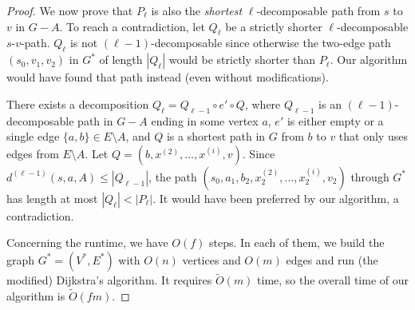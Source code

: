 \documentclass{article}\usepackage[a4paper,margin=20mm]{geometry}
\newcommand*{\Otilde}{\widetilde{O}}
\newcommand*{\length}[1]{|#1|}
\renewcommand{\le}{\leqslant}
\begin{document}
\begin{proof}
We now prove that $P_{\ell}$ is also the \emph{shortest} $\ell$-decomposable path from $s$ to $v$
in $G{-}A$.
To reach a contradiction, let $Q_{\ell}$ be a strictly shorter $\ell$-decomposable $s$-$v$-path.
$Q_{\ell}$ is not $(\ell{-}1)$-decomposable
since otherwise the two-edge path $(s_0,v_1,v_2)$ in $G^*$ of length $\length{Q_{\ell}}$ 
would be strictly shorter than $P_\ell$.
Our algorithm would have found that path instead (even without modifications).

There exists a decomposition $Q_\ell = Q_{\ell-1} \circ e' \circ Q$,
where $Q_{\ell-1}$ is an $(\ell{-}1)$-decomposable path in $G-A$ ending in some vertex $a$,
$e'$ is either empty or a single edge $\{a,b\} \in E{\setminus}A$,
and $Q$ is a shortest path in $G$ from $b$ to $v$ that only uses edges from $E{\setminus}A$.
Let $Q = (b,x^{(2)}, \dots, x^{(i)},v)$.
Since $d^{(\ell-1)}(s, a, A) \le \length{Q_{\ell-1}}$,
the path $(s_0,a_1,b_2,x^{(2)}_2, \dots, x^{(i)}_2, v_2)$ through $G^*$
has length at most $\length{Q_\ell} < \length{P_\ell}$.
It would have been preferred by our algorithm,
a contradiction.

Concerning the runtime, we have $O(f)$ steps. 
In each of them, we build the graph $G^*=(V^*,E^*)$ with $O(n)$ vertices and $O(m)$ edges 
and run (the modified) Dijkstra's algorithm.
It requires $\Otilde(m)$ time,
so the overall time of our algorithm is $\Otilde(fm)$.
\end{proof}
\end{document}
